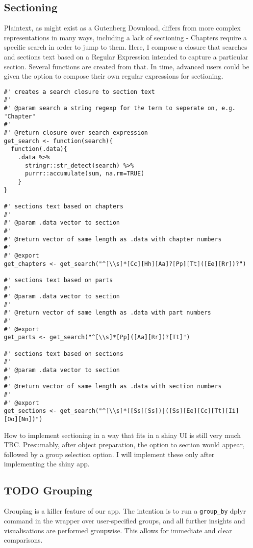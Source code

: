 \documentclass[a4paper, 11pt]{article}
\begin{document}
\subsection{Sectioning}
\label{sec:org05c082f}
Plaintext, as might exist as a Gutenberg Download, differs from more
complex representations in many ways, including a lack of sectioning -
Chapters require a specific search in order to jump to them. Here, I
compose a closure that searches and sections text based on a Regular
Expression intended to capture a particular section. Several functions
are created from that. In time, advanced users could be given the
option to compose their own regular expressions for sectioning.
\begin{verbatim}
#' creates a search closure to section text
#'
#' @param search a string regexp for the term to seperate on, e.g. "Chapter"
#'
#' @return closure over search expression 
get_search <- function(search){
  function(.data){
    .data %>%
      stringr::str_detect(search) %>%
      purrr::accumulate(sum, na.rm=TRUE)
    }
}

#' sections text based on chapters
#'
#' @param .data vector to section
#'
#' @return vector of same length as .data with chapter numbers
#'
#' @export
get_chapters <- get_search("^[\\s]*[Cc][Hh][Aa]?[Pp][Tt]([Ee][Rr])?")

#' sections text based on parts
#'
#' @param .data vector to section
#'
#' @return vector of same length as .data with part numbers
#'
#' @export
get_parts <- get_search("^[\\s]*[Pp]([Aa][Rr])?[Tt]")

#' sections text based on sections
#'
#' @param .data vector to section
#'
#' @return vector of same length as .data with section numbers
#'
#' @export
get_sections <- get_search("^[\\s]*([Ss][Ss])|([Ss][Ee][Cc][Tt][Ii][Oo][Nn])")
\end{verbatim}

How to implement sectioning in a way that fits in a shiny UI is still
very much TBC. Presumably, after object preparation, the option to
section would appear, followed by a group selection option. I will
implement these only after implementing the shiny app.
\subsection{{\bfseries\sffamily TODO} Grouping}
\label{sec:org0d34159}
Grouping is a killer feature of our app. The intention is to run a
\texttt{group\_by} dplyr command in the wrapper over user-specified groups,
and all further insights and visualisations are performed groupwise.
This allows for immediate and clear comparisons.
\end{document}
